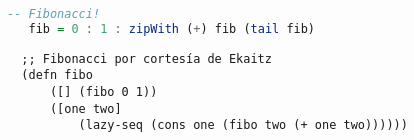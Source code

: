 \documentclass[a4paper,11pt]{article}
\begin{document}
  \begin{lstlisting}[language=haskell]
   -- Fibonacci!
   fib = 0 : 1 : zipWith (+) fib (tail fib)
  \end{lstlisting}
  
  \begin{verbatim}
  ;; Fibonacci por cortesía de Ekaitz
  (defn fibo
      ([] (fibo 0 1))
      ([one two]
          (lazy-seq (cons one (fibo two (+ one two))))))
  \end{verbatim}
\end{document}
